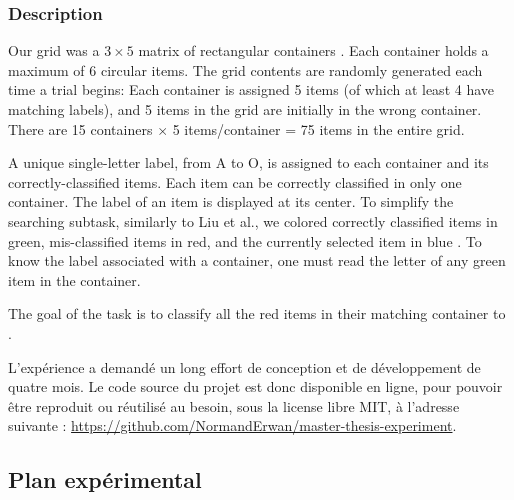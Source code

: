 \subsubsection{Description}


Our grid was a $3 \times 5$ matrix of rectangular containers . Each container holds a maximum of 6 circular items. The grid contents are randomly generated each time a trial begins: Each container is assigned 5 items (of which at least 4 have matching labels), and 5 items in the grid are initially in the wrong container. There are 15 containers $\times$ 5 items/container = 75 items in the entire grid.

A unique single-letter label, from A to O, is assigned to each container and its correctly-classified items. Each item can be correctly classified in only one container. The label of an item is displayed at its center. To simplify the searching subtask, similarly to Liu et al., we colored correctly classified items in green, mis-classified items in red, and the currently selected item in blue . To know the label associated with a container, one must read the letter of any green item in the container.

The goal of the task is to classify all the red items in their matching container to  \citep{Liu2014}.

L'expérience a demandé un long effort de conception et de développement de quatre mois. Le code source du projet est donc disponible en ligne, pour pouvoir être reproduit ou réutilisé au besoin, sous la license libre MIT, à l'adresse suivante : \url{https://github.com/NormandErwan/master-thesis-experiment}.


\subsection{Plan expérimental}
\label{subsec:experiment_design}


